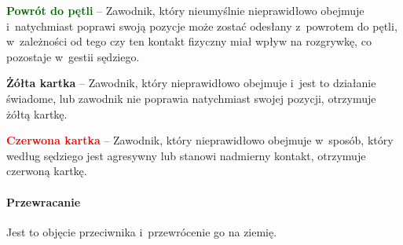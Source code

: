 \documentclass[12pt,a4paper]{article}
\newcommand\redcard[1]{\bgroup\textcolor{red}{\textbf{#1}}}
\newcommand\yellowcard[1]{\bgroup\textcolor{darkyellow}{\textbf{#1}}}
\newcommand\other[1]{\bgroup\textcolor{darkgreen}{\textbf{#1}}}
\begin{document}
\other{Powrót do pętli} -- Zawodnik, który nieumyślnie nieprawidłowo
obejmuje i~natychmiast poprawi swoją pozycje może zostać odesłany z~powrotem do pętli, w~zależności od tego czy ten kontakt fizyczny miał
wpływ na rozgrywkę, co pozostaje w~gestii sędziego.

\yellowcard{Żółta kartka} -- Zawodnik, który nieprawidłowo obejmuje i~jest to
działanie świadome, lub zawodnik nie poprawia natychmiast swojej
pozycji, otrzymuje żółtą kartkę.

\redcard{Czerwona kartka} -- Zawodnik, który nieprawidłowo obejmuje w~sposób, który według sędziego jest agresywny lub stanowi nadmierny
kontakt, otrzymuje czerwoną kartkę.

\paragraph{Przewracanie}
Jest to objęcie przeciwnika i~przewrócenie go na ziemię.
\end{document}
